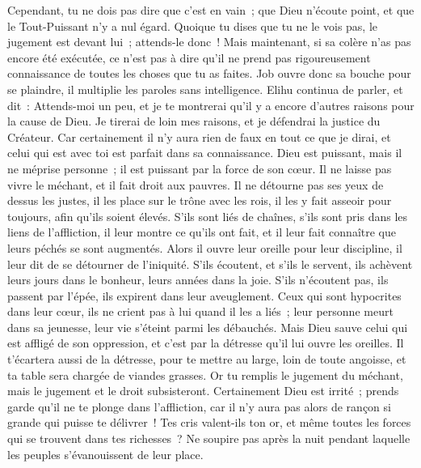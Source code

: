 \begin{multicols}{2}
Cependant, tu ne dois pas dire que c'est en vain~; que Dieu n'écoute point, et que le Tout-Puissant n'y a nul égard.
Quoique tu dises que tu ne le vois pas, le jugement est devant lui~; attends-le donc~!
Mais maintenant, si sa colère n'as pas encore été exécutée, ce n'est pas à dire qu'il ne prend pas rigoureusement connaissance de toutes les choses que tu as faites.
Job ouvre donc sa bouche pour se plaindre, il multiplie les paroles sans intelligence.
\VerseOne{}Elihu continua de parler, et dit~:
Attends-moi un peu, et je te montrerai qu'il y a encore d'autres raisons pour la cause de Dieu.
Je tirerai de loin mes raisons, et je défendrai la justice du Créateur.
Car certainement il n'y aura rien de faux en tout ce que je dirai, et celui qui est avec toi est parfait dans sa connaissance.
Dieu est puissant, mais il ne méprise personne~; il est puissant par la force de son cœur.
Il ne laisse pas vivre le méchant, et il fait droit aux pauvres.
Il ne détourne pas ses yeux de dessus les justes, il les place sur le trône avec les rois, il les y fait asseoir pour toujours, afin qu'ils soient élevés.
S'ils sont liés de chaînes, s'ils sont pris dans les liens de l'affliction,
il leur montre ce qu'ils ont fait, et il leur fait connaître que leurs péchés se sont augmentés.
Alors il ouvre leur oreille pour leur discipline, il leur dit de se détourner de l'iniquité.
S'ils écoutent, et s'ils le servent, ils achèvent leurs jours dans le bonheur, leurs années dans la joie.
S'ils n'écoutent pas, ils passent par l'épée, ils expirent dans leur aveuglement.
Ceux qui sont hypocrites dans leur cœur, ils ne crient pas à lui quand il les a liés~;
leur personne meurt dans sa jeunesse, leur vie s'éteint parmi les débauchés.
Mais Dieu sauve celui qui est affligé de son oppression, et c'est par la détresse qu'il lui ouvre les oreilles.
Il t'écartera aussi de la détresse, pour te mettre au large, loin de toute angoisse, et ta table sera chargée de viandes grasses.
Or tu remplis le jugement du méchant, mais le jugement et le droit subsisteront.
Certainement Dieu est irrité~; prends garde qu'il ne te plonge dans l'affliction, car il n'y aura pas alors de rançon si grande qui puisse te délivrer~!
Tes cris valent-ils ton or, et même toutes les forces qui se trouvent dans tes richesses~?
Ne soupire pas après la nuit pendant laquelle les peuples s'évanouissent de leur place.

\end{multicols}
